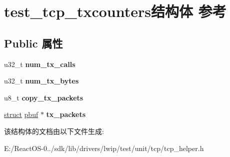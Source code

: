 \hypertarget{structtest__tcp__txcounters}{}\section{test\+\_\+tcp\+\_\+txcounters结构体 参考}
\label{structtest__tcp__txcounters}
\subsection*{Public 属性}
\begin{DoxyCompactItemize}
\item 
\mbox{\label{structtest__tcp__txcounters_a61b0361db9f1d20b1d35bc662da7ae4a}} 
u32\+\_\+t {\bfseries num\+\_\+tx\+\_\+calls}
\item 
\mbox{\label{structtest__tcp__txcounters_ae57b79f1ce0d06e87bf3870bb13eb4f9}} 
u32\+\_\+t {\bfseries num\+\_\+tx\+\_\+bytes}
\item 
\mbox{\label{structtest__tcp__txcounters_a5ed30ef06469ce08254074f94beada27}} 
u8\+\_\+t {\bfseries copy\+\_\+tx\+\_\+packets}
\item 
\mbox{\label{structtest__tcp__txcounters_a6746cac5eecfeacb0f57053a72692116}} 
\hyperlink{interfacestruct}{struct} \hyperlink{structpbuf}{pbuf} $\ast$ {\bfseries tx\+\_\+packets}
\end{DoxyCompactItemize}


该结构体的文档由以下文件生成\+:\begin{DoxyCompactItemize}
\item 
E\+:/\+React\+O\+S-\/0../sdk/lib/drivers/lwip/test/unit/tcp/tcp\+\_\+helper.\+h\end{DoxyCompactItemize}
